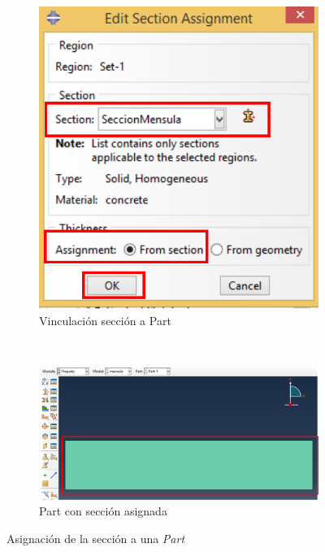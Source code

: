 \begin{enumerate}
\begin{figure}[H]
\begin{subfigure}{0.29\textwidth}
      \includegraphics[width=\textwidth]{./body/images/imagen19.pdf}
      \caption{Vinculación sección a Part}
      \label{figu19}
    \end{subfigure}%
    ~ %
    \begin{subfigure}{0.49\textwidth}
      \includegraphics[width=\textwidth]{./body/images/imagen20.pdf}
      \caption{Part con sección asignada}
      \label{figu20}
    \end{subfigure}
    \caption{Asignación de la sección a una \textit{Part}}
  \end{figure}
\end{enumerate}
\newpage
